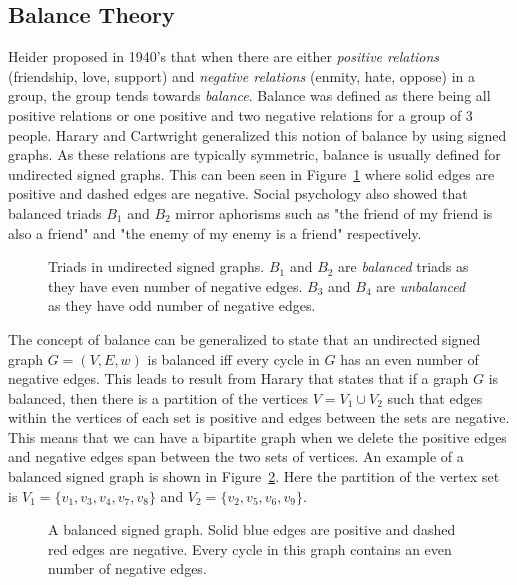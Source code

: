 \subsection{Balance Theory}
\label{sec:balance-theory}


Heider \cite{heider1946attitudes} proposed in 1940's that when there are either \textit{positive relations} (friendship, love, support) and \textit{negative relations} (enmity, hate, oppose) in a group, the  group tends towards \textit{balance}. Balance was defined as there being all positive relations or one positive and two negative relations for a group of 3 people. Harary and Cartwright \cite{cartwright1956structural} generalized this notion of balance by using signed graphs. As these relations are typically symmetric, balance is usually defined for undirected signed graphs. This can been seen in Figure~\ref{fig:signed-triads} where solid edges are positive and dashed edges are negative. Social psychology also showed that balanced triads $B_1$ and $B_2$ mirror aphorisms such as "the friend of my friend is also a friend" and "the enemy of my enemy is a friend" respectively.

\begin{figure}[!ht]     
    \centering
      
    \caption{Triads in undirected signed graphs. $B_1$ and $B_2$ are \textit{balanced} triads as they have even number of negative edges. $B_3$ and $B_4$ are \textit{unbalanced} as they have odd number of negative edges.}
    \label{fig:signed-triads}
\end{figure}

The concept of balance can be generalized to state that an undirected signed graph $G=(V,E,w)$ is balanced iff every cycle in $G$ has an even number of negative edges. This leads to result from Harary \cite{harary1953on} that states that if a graph $G$ is balanced, then there is a partition of the vertices $V = V_1 \cup V_2$ such that edges within the vertices of each set is positive and edges between the sets are negative. This means that we can have a bipartite graph when we delete the positive edges and negative edges span between the two sets of vertices. An example of a balanced signed graph is shown in Figure~\ref{fig:balanced-graph}. Here the partition of the vertex set is $V_1 = \{v_1,v_3,v_4,v_7,v_8\}$ and $V_2 = \{v_2,v_5,v_6,v_9\}$.

\begin{figure}[!ht]
    \centering
    
    \caption{ A balanced signed graph. Solid blue edges are positive and dashed red edges are negative. Every cycle in this graph contains an even number of negative edges.}
    \label{fig:balanced-graph}
\end{figure}

